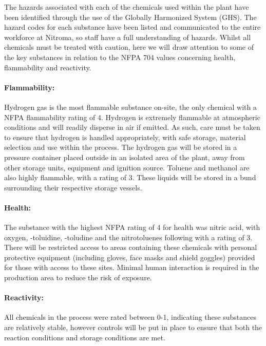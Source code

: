 The hazards associated with each of the chemicals used within the plant have been identified through the use of the Globally Harmonized System (GHS). The hazard codes for each substance have been listed and communicated to the entire workforce at Nitroma, so staff have a full understanding of hazards. Whilst all chemicals must be treated with caution, here we will draw attention to some of the key substances in relation to the NFPA 704 values concerning health, flammability and reactivity. 

\paragraph{Flammability:}

Hydrogen gas is the most flammable substance on-site, the only chemical with a NFPA flammability rating of 4.  Hydrogen is extremely flammable at atmospheric conditions and will readily disperse in air if emitted. As such, care must be taken to ensure that hydrogen is handled appropriately, with safe storage, material selection and use within the process. The hydrogen gas will be stored in a pressure container placed outside in an isolated area of the plant, away from other storage units, equipment and ignition source.  Toluene and methanol are also highly flammable, with a rating of 3. These liquids will be stored in a bund surrounding their respective storage vessels. 


\paragraph{Health:}

The substance with the highest NFPA rating of 4 for health was nitric acid, with oxygen, \para-toluidine, \ortho-toludine and the nitrotoluenes  following with a rating of 3. There will be restricted access to areas containing these chemicals with personal protective equipment (including gloves, face masks and shield goggles) provided for those with access to these sites. Minimal human interaction is required in the production area to reduce the risk of exposure.

\paragraph{Reactivity:}

All chemicals in the process were rated between 0-1, indicating these substances are relatively stable, however controls will be put in place to ensure that both the reaction conditions and storage conditions are met. 


